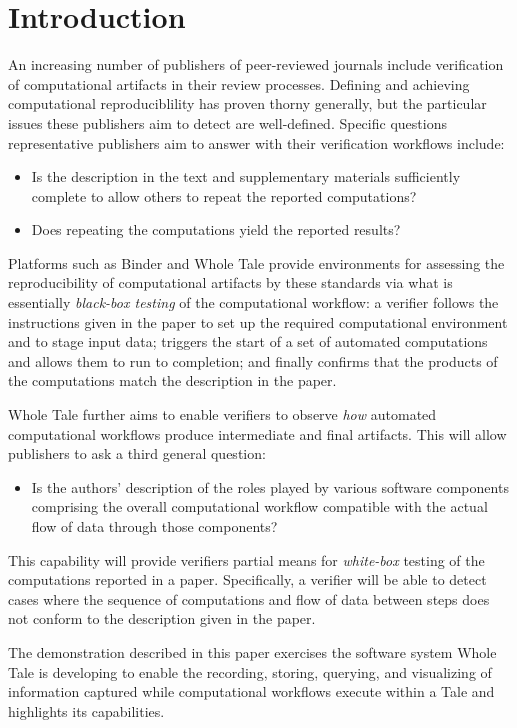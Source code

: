 \section{Introduction}

An increasing number of publishers of peer-reviewed journals include verification of computational artifacts in their review processes.  Defining and achieving computational reproduciblility has proven thorny generally, but the particular issues these publishers aim to detect are well-defined. Specific questions representative publishers aim to answer with their verification workflows include:

\begin{itemize}[label=\raisebox{0.25ex}{\tiny$\bullet$}]

\item Is the description in the text and supplementary materials sufficiently complete to allow others to repeat the reported computations?

\item Does repeating the computations yield the reported results?

\end{itemize}

Platforms such as Binder and Whole Tale provide environments for assessing the reproducibility of computational artifacts by these standards via what is essentially \emph{black-box testing} of the computational workflow: a verifier follows the instructions given in the paper to set up the required computational environment and to stage input data; triggers the start of a set of automated computations and allows them to run to completion; and finally confirms that the products of the computations match the description in the paper.

Whole Tale further aims to enable verifiers to observe \emph{how} automated computational workflows produce intermediate and final artifacts. This will allow publishers to ask a third general question:

\begin{itemize}[label=\raisebox{0.25ex}{\tiny$\bullet$}]

\item Is the authors' description of the roles played by various software components comprising the overall computational workflow compatible with the actual flow of data through those components?

\end{itemize}

This capability will provide verifiers partial means for \emph{white-box} testing of the computations reported in a paper. Specifically, a verifier will be able to detect cases where the sequence of computations and flow of data between steps does not conform to the description given in the paper.  

The demonstration described in this paper exercises the software system Whole Tale is developing to enable the recording, storing, querying, and visualizing of information captured while computational workflows execute within a Tale and highlights its capabilities.






